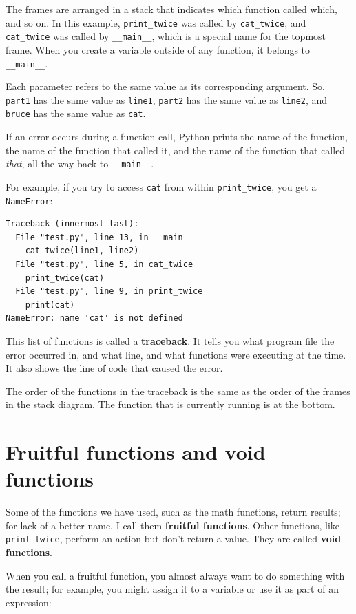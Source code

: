 The frames are arranged in a stack that indicates which function
called which, and so on.  In this example, \verb"print_twice"
was called by \verb"cat_twice", and \verb"cat_twice" was called by
\verb"__main__", which is a special name for the topmost frame.  When
you create a variable outside of any function, it belongs to
\verb"__main__".

Each parameter refers to the same value as its corresponding
argument.  So, {\tt part1} has the same value as
{\tt line1}, {\tt part2} has the same value as {\tt line2},
and {\tt bruce} has the same value as {\tt cat}.

If an error occurs during a function call, Python prints the
name of the function, the name of the function that called
it, and the name of the function that called {\em that}, all the
way back to \verb"__main__".

For example, if you try to access {\tt cat} from within
\verb"print_twice", you get a {\tt NameError}:

\begin{lstlisting}
Traceback (innermost last):
  File "test.py", line 13, in __main__
    cat_twice(line1, line2)
  File "test.py", line 5, in cat_twice
    print_twice(cat)
  File "test.py", line 9, in print_twice
    print(cat)
NameError: name 'cat' is not defined
\end{lstlisting}
%
This list of functions is called a {\bf traceback}.  It tells you what
program file the error occurred in, and what line, and what functions
were executing at the time.  It also shows the line of code that
caused the error.

The order of the functions in the traceback is the same as the
order of the frames in the stack diagram.  The function that is
currently running is at the bottom.


%
\section{Fruitful functions and void functions}

Some of the functions we have used, such as the math functions, return
results; for lack of a better name, I call them {\bf fruitful
  functions}.  Other functions, like \verb"print_twice", perform an
action but don't return a value.  They are called {\bf void
  functions}.

When you call a fruitful function, you almost always
want to do something with the result; for example, you might
assign it to a variable or use it as part of an expression:

